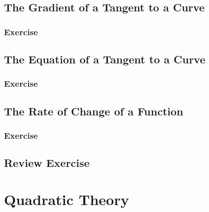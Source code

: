\documentclass[
  11pt,
  openany]{book}
\begin{document}
\section{The Gradient of a Tangent to a Curve}\label{the-gradient-of-a-tangent-to-a-curve}

\newpage

\subsection*{Exercise}\label{exercise-14}

\newpage

\section{The Equation of a Tangent to a Curve}\label{the-equation-of-a-tangent-to-a-curve}

\newpage

\subsection*{Exercise}\label{exercise-15}

\newpage

\section{The Rate of Change of a Function}\label{the-rate-of-change-of-a-function}

\newpage

\subsection*{Exercise}\label{exercise-16}

\newpage

\section*{Review Exercise}\label{review-exercise-2}

\chapterfont{\color{white}}

\chapter{Quadratic Theory}\label{quadratic-theory}
\end{document}

